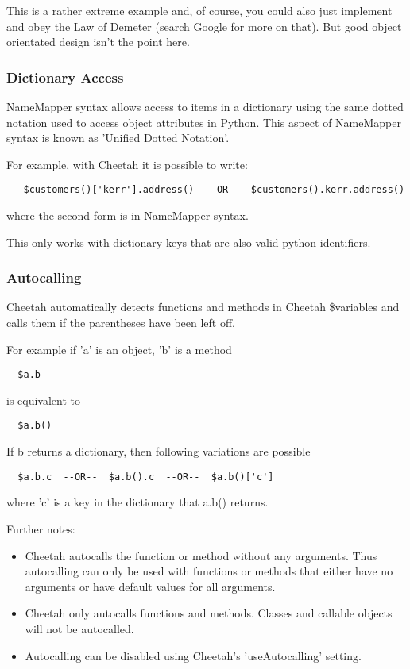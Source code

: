 This is a rather extreme example and, of course, you could also just implement
 and obey the Law of Demeter (search Google for more
on that).  But good object orientated design isn't the point here.

\subsubsection{Dictionary Access}
\label{language.namemapper.dict}

NameMapper syntax allows access to items in a dictionary using the same dotted
notation used to access object attributes in Python.  This aspect of NameMapper
syntax is known as 'Unified Dotted Notation'.

For example, with Cheetah it is possible to write:
\begin{verbatim}
   $customers()['kerr'].address()  --OR--  $customers().kerr.address()
\end{verbatim}
where the second form is in NameMapper syntax.

This only works with dictionary keys that are also valid python identifiers.

\subsubsection{Autocalling}
\label{language.namemapper.autocalling}

Cheetah automatically detects functions and methods in Cheetah \$variables and calls
them if the parentheses have been left off.  

For example if 'a' is an object, 'b' is a method
\begin{verbatim}
  $a.b
\end{verbatim}

is equivalent to

\begin{verbatim}
  $a.b()
\end{verbatim}

If b returns a dictionary, then following variations are possible
\begin{verbatim}
  $a.b.c  --OR--  $a.b().c  --OR--  $a.b()['c']
\end{verbatim}
where 'c' is a key in the dictionary that a.b() returns.

Further notes:
\begin{itemize}
\item Cheetah autocalls the function or method without any arguments.  Thus
autocalling can only be used with functions or methods that either have no
arguments or have default values for all arguments.

\item Cheetah only autocalls functions and methods.  Classes and callable objects
will not be autocalled.  

\item Autocalling can be disabled using Cheetah's 'useAutocalling' setting.
\end{itemize}

